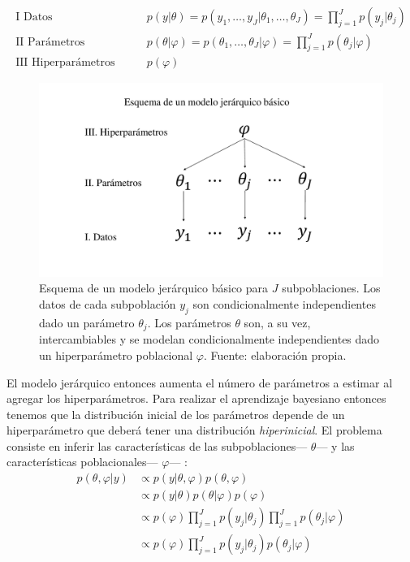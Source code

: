 \begin{align} \label{eq:Esquema_Modelo_Jer}	
\text{I Datos} \qquad & p(y|\theta)=p(y_1,\dots,y_J|\theta_1,\dots,\theta_J)=\prod\limits_{j=1}^Jp(y_j|\theta_j) \nonumber \\
\text{II Parámetros} \qquad & p(\theta|\varphi)=p(\theta_1,\dots,\theta_J|\varphi) = \prod\limits_{j=1}^Jp(\theta_j|\varphi) \nonumber \\
\text{III Hiperparámetros} \qquad & p(\varphi)
\end{align}

\begin{figure}[h]
	\centering
	\includegraphics[scale=0.25]{Figs/Bayes/Modelo_Jer}
	\caption{Esquema de un modelo jerárquico básico para $J$ subpoblaciones. Los datos de cada subpoblación $y_j$ son condicionalmente independientes dado un parámetro $\theta_j$. Los parámetros $\theta$ son, a su vez, intercambiables y se modelan condicionalmente independientes dado un hiperparámetro poblacional $\varphi$. Fuente: elaboración propia.}
	\label{fig:Esquema_Modelo_Jer}	
\end{figure}

El modelo jerárquico entonces aumenta el número de parámetros a estimar al agregar los hiperparámetros. Para realizar el aprendizaje bayesiano entonces tenemos que la distribución inicial de los parámetros depende de un hiperparámetro que deberá tener una distribución \textit{hiperinicial}. El problema consiste en inferir las características de las subpoblaciones--- $\theta$--- y las características poblacionales--- $\varphi$--- \parencite[23]{GP98}: 
\begin{align} \label{eq:Bayes_Modelo_Jer}	
p(\theta,\varphi|y) & \propto p(y|\theta,\varphi)p(\theta,\varphi) \nonumber \\
&\propto p(y|\theta)p(\theta|\varphi)p(\varphi) \nonumber \\
&\propto p(\varphi)\prod\limits_{j=1}^Jp(y_j|\theta_j)\prod\limits_{j=1}^Jp(\theta_j|\varphi) \nonumber \\
&\propto p(\varphi)\prod\limits_{j=1}^Jp(y_j|\theta_j)p(\theta_j|\varphi)
\end{align}

